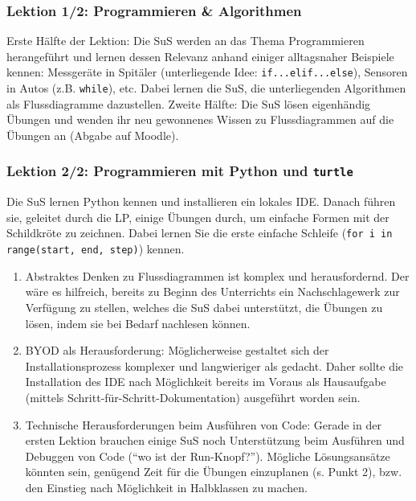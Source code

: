 \begin{myExBox}[title=DL \themycounter]
\subsubsection*{Lektion 1/2: Programmieren \& Algorithmen}
Erste Hälfte der Lektion: Die SuS werden an das Thema Programmieren herangeführt und lernen dessen Relevanz anhand einiger alltagsnaher Beispiele kennen: Messgeräte in Spitäler (unterliegende Idee: \lstinline|if...elif...else|), Sensoren in Autos (z.B. \lstinline|while|), etc. Dabei lernen die SuS, die unterliegenden Algorithmen als Flussdiagramme dazustellen. Zweite Hälfte: Die SuS lösen eigenhändig Übungen und wenden ihr neu gewonnenes Wissen zu Flussdiagrammen auf die Übungen an (Abgabe auf Moodle).

\subsubsection*{Lektion 2/2: Programmieren mit Python und \lstinline|turtle|}
Die SuS lernen Python kennen und installieren ein lokales IDE. Danach führen sie, geleitet durch die LP, einige Übungen durch, um einfache Formen mit der Schildkröte zu zeichnen. Dabei lernen Sie die erste einfache Schleife (\lstinline|for i in range(start, end, step)|) kennen.

\begin{myExBox}[title=Mögliche Schwierigkeiten \& geeignete Massnahmen]
\begin{enumerate}
    \item Abstraktes Denken zu Flussdiagrammen ist komplex und herausfordernd. Der wäre es hilfreich, bereits zu Beginn des Unterrichts ein Nachschlagewerk zur Verfügung zu stellen, welches die SuS dabei unterstützt, die Übungen zu lösen, indem sie bei Bedarf nachlesen können.
    \item BYOD als Herausforderung: Möglicherweise gestaltet sich der Installationsprozess komplexer und langwieriger als gedacht. Daher sollte die Installation des IDE nach Möglichkeit bereits im Voraus als Hausaufgabe (mittels Schritt-für-Schritt-Dokumentation) ausgeführt worden sein.
    \item Technische Herausforderungen beim Ausführen von Code: Gerade in der ersten Lektion brauchen einige SuS noch Unterstützung beim Ausführen und Debuggen von Code (``wo ist der Run-Knopf?''). Mögliche Lösungsansätze könnten sein, genügend Zeit für die Übungen einzuplanen (s. Punkt 2), bzw. den Einstieg nach Möglichkeit in Halbklassen zu machen. 
\end{enumerate}
\end{myExBox}
\end{myExBox}
\newpage{}

